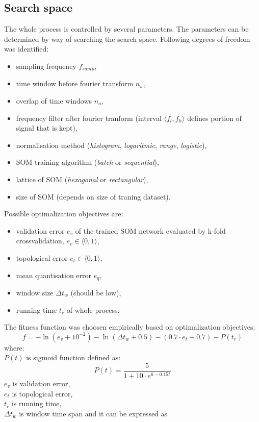 \documentclass[a4paper]{IEEEtran}
\begin{document}
\subsection{Search space}
The whole process is controlled by several parameters.
The parameters can be determined by way of searching the search space.
Following degrees of freedom was identified:
\begin{itemize}
	\item sampling frequency $ f_{samp} $,
	\item time window before fourier transform $ n_w $,
	\item overlap of time windows $ n_o $,
	\item frequency filter after fourier tranform (interval $ \langle f_l, f_h
	\rangle $ defines portion of signal that is kept),
	\item normalisation method (\textit{histogram}, \textit{logaritmic}, 
	\textit{range}, \textit{logistic}),
	\item SOM training algorithm (\textit{batch} or \textit{sequential}),
	\item lattice of SOM (\textit{hexagonal} or \textit{rectangular}),
	\item size of SOM (depends on size of traning dataset).
\end{itemize}
Possible optimalization objectives are:%
\begin{itemize}
	\item validation error $ e_v $ of the trained SOM network evaluated by k-fold
	crossvalidation, $ e_v \in \langle 0, 1 \rangle $,
	\item topological error $ e_t \in \langle 0, 1 \rangle $,
	\item mean quantisation error $ e_q $,
	\item window size $ \Delta t_w $ (should be low),
	\item running time $ t_r $ of whole process.
\end{itemize}
The fitness function was choosen empirically based on optimalization objectives:
\[ f = -\ln(e_v+10^{-2 }) - \ln(\Delta t_w+0.5) - (0.7\cdot e_t-0.7) - P(t_r) \]
where:\\
$ P(t) $ is sigmoid function defined as:
\[ P(t) = \frac{5}{1+10\cdot e^{6-0.15t}} \]
$ e_v $ is validation error,\\
$ e_t $ is topological error,\\
$ t_r $ is running time,\\
$ \Delta t_w $ is window time span and it can be expressed as 
\end{document}
